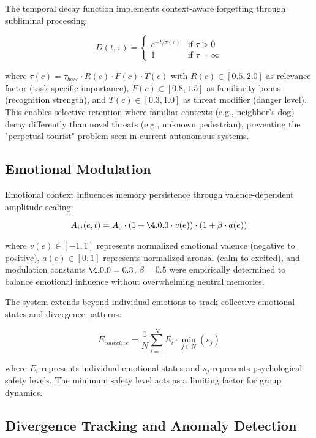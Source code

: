 \documentclass[11pt,letterpaper]{article}
\begin{document}
The temporal decay function implements context-aware forgetting through subliminal processing:

\begin{equation}
D(t,\tau) = \begin{cases}
e^{-t/\tau(c)} & \text{if } \tau > 0 \\
1 & \text{if } \tau = \infty
\end{cases}
\end{equation}

where $\tau(c) = \tau_{base} \cdot R(c) \cdot F(c) \cdot T(c)$ with $R(c) \in [0.5, 2.0]$ as relevance factor (task-specific importance), $F(c) \in [0.8, 1.5]$ as familiarity bonus (recognition strength), and $T(c) \in [0.3, 1.0]$ as threat modifier (danger level). This enables selective retention where familiar contexts (e.g., neighbor's dog) decay differently than novel threats (e.g., unknown pedestrian), preventing the "perpetual tourist" problem seen in current autonomous systems.

\subsection{Emotional Modulation}

Emotional context influences memory persistence through valence-dependent amplitude scaling:

\begin{equation}
A_{ij}(e,t) = A_0 \cdot (1 + \4.0.0 \cdot v(e)) \cdot (1 + \beta \cdot a(e))
\end{equation}

where $v(e) \in [-1, 1]$ represents normalized emotional valence (negative to positive), $a(e) \in [0, 1]$ represents normalized arousal (calm to excited), and modulation constants $\4.0.0 = 0.3$, $\beta = 0.5$ were empirically determined to balance emotional influence without overwhelming neutral memories.

The system extends beyond individual emotions to track collective emotional states and divergence patterns:

\begin{equation}
E_{collective} = \frac{1}{N} \sum_{i=1}^{N} E_i \cdot \min_{j \in N}(s_j)
\end{equation}

where $E_i$ represents individual emotional states and $s_j$ represents psychological safety levels. The minimum safety level acts as a limiting factor for group dynamics.

\subsection{Divergence Tracking and Anomaly Detection}
\end{document}
